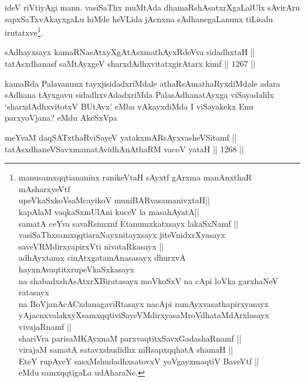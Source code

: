\begin{artha}
ideV riVtiyAgi manu. vasiSaThx muMtAda dhamaRshAsatxrXgaLalUlx sAvirAru sapxSaTxvAkayxgaLu hiMde heVLida jAcnxna sAdhanegaLanunx tiLisalu irutatxve\footnote{manusamxqqtiananinx ranikeVtaH sAyxtf gArxma manAnxthaR mAsharxyeVtf\\
upeVkaSxkoV\s saMcayikoV muniBARvasamanivxtaH||\\
kapAlaM vaqkaSxmUlAni kuceV la masahAyatA||\\
samatA ceYva savaRsimxnf Etanumxkatxsayx lakaSxNamf ||\\ vasiSaThxsamxqqti\ndash araNayxnitayxsayx jiteVnidxrXyasayx saveVRMdirxyapirxVti nivataRkasayx ||\\
adhAyxtamx cinAtxgatamAnasasayx dhurxvA hayxnAvaqtitxrupeVkaSxkasayx \\
na shabadxshAsAtxrXBiratasayx moVkoSxV na cApi loVka garxhaNeV ratasayx\\
na BoVjanAcACxdanagaviRtasayx nacApi ramAyxvasathapirxyasayx \\ yAjacnxvalakxyXsamxqqti\ndash  viSayeVMdirxyasaMroVdhataMdArxlasayx vivajaRnamf ||\\
shariVra parisaMKAyxnaM parxvaqtitxSavxGadashaRnamf ||\\
virajaM samatA satavxshudidhx niRsapxqqhatA shamaH ||\\
EteY rupAyeY sasxMshudadhxsatovxV yoVgayxmaqtiV BaveVtf ||\\ eMdu samxqqtigaLa udAharaNe.}.
\end{artha}


\begin{shl}
sAdhayxsayx kamaRNasAtxyXgAtAsxmathAyxRdeVva sidadhxtaH || \\
tatAsxdhanasf saMtAyxgeV sharxdAdhxvitatxgirA\s tarx kimf \hfill || 1267 || 
\end{shl}

\begin{artha}
kamaRda Palavanunx tayxjisidadxriMdale athaRsAmathaRyxdiMdale adara sAdhana tAyxgavu sidadhxvAdadxriMda PalasAdhanatAyxga viSayadalilx `sharxdAdhxvitotxV BUtAvx' eMba vAkayxdiMda I viSayakekx Enu parxyoVjana? eMdu AkeSxVpa
\end{artha}

\begin{shl}
meYvaM daqSATxthaRviSayeV yatakxmARsAyxvasheVSitamf || \\
tatAsxdhaneVSavxmamatAvidhAnAthaRM vacoV yataH \hfill || 1268 ||  
\end{shl}

